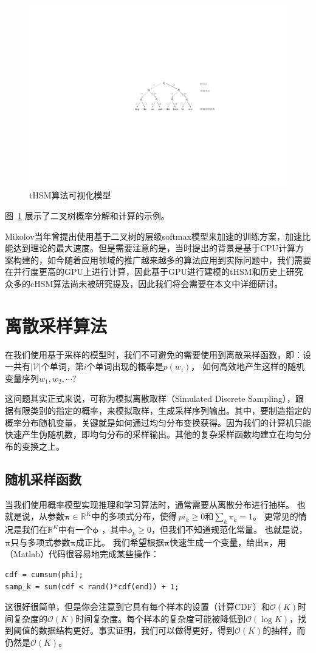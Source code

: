 \begin{figure}[!h]
  \centering
\includegraphics[width=0.9\linewidth]{./figures/thsm-example.pdf}
\caption{tHSM算法可视化模型}\label{fig:case_thsm}
\end{figure}

图~\ref{fig:case_thsm} 展示了二叉树概率分解和计算的示例。

Mikolov当年曾提出使用基于二叉树的层级softmax模型来加速的训练方案，加速比能达到理论的最大速度。但是需要注意的是，当时提出的背景是基于CPU计算方案构建的，如今随着应用领域的推广越来越多的算法应用到实际问题中，我们需要在并行度更高的GPU上进行计算，因此基于GPU进行建模的tHSM和历史上研究众多的cHSM算法尚未被研究提及，因此我们将会需要在本文中详细研讨。

\section{离散采样算法}
在我们使用基于采样的模型时，我们不可避免的需要使用到离散采样函数，即：设一共有$|\mathcal{V}|$个单词，第$i$个单词出现的概率是$p(w_i)$， 如何高效地产生这样的随机变量序列$w_1,w_2,\cdots$?

这问题其实正式来说，可称为模拟离散取样（Simulated Discrete Sampling），跟据有限类别的指定的概率，来模拟取样，生成采样序列输出。其中，要制造指定的概率分布随机变量，关键就是如何通过均匀分布变换获得。因为我们的计算机只能快速产生伪随机数，即均匀分布的采样输出。其他的复杂采样函数均建立在均匀分布的变换之上。
\subsection{随机采样函数}
当我们使用概率模型实现推理和学习算法时，通常需要从离散分布进行抽样。 也就是说，从参数$\boldsymbol {\pi} \in \mathbb{R} ^ K$中的多项式分布，使得$\ pi_k \geq 0$和$\sum_{k} \pi_k = 1$。 更常见的情况是我们在$\mathbb{R}^K$中有一个$\boldsymbol {\phi}$ ，其中$\phi_k \geq 0$，但我们不知道规范化常量。 也就是说，$\boldsymbol{\pi}$只与多项式参数$\boldsymbol {\pi}$成正比。 我们希望根据$\boldsymbol{\pi}$快速生成一个变量，给出$\boldsymbol {\pi}$，用（Matlab）代码很容易地完成某些操作：
\begin{verbatim}
cdf = cumsum(phi);
samp_k = sum(cdf < rand()*cdf(end)) + 1;
\end{verbatim}
这很好很简单，但是你会注意到它具有每个样本的设置（计算CDF）和$\mathcal {O}(K)$时间复杂度的$\mathcal {O}(K)$时间复杂度。每个样本的复杂度可能被降低到$\mathcal {O}(\log K)$，找到阈值的数据结构更好。事实证明，我们可以做得更好，得到$\mathcal {O}(K)$的抽样，而仍然是$\mathcal {O}(K)$。
